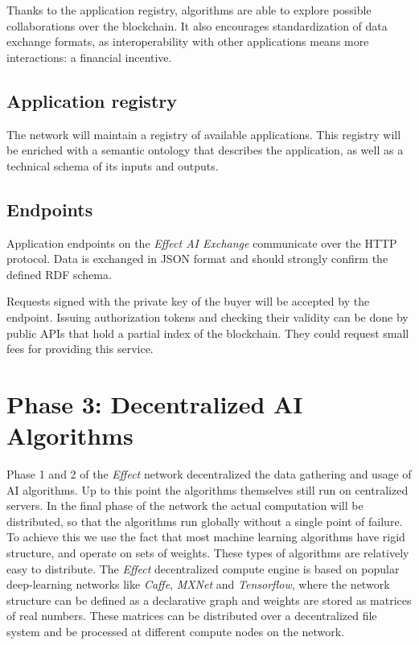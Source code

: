 \documentclass{article}
\begin{document}
Thanks to the application registry, algorithms are able to explore
possible collaborations over the blockchain. It also encourages
standardization of data exchange formats, as interoperability with
other applications means more interactions: a financial incentive.

\subsection{Application registry}
The network will maintain a registry of available applications. This
registry will be enriched with a semantic ontology that describes the
application, as well as a technical schema of its inputs and
outputs.

\subsection{Endpoints}
Application endpoints on the \emph{Effect AI Exchange} communicate
over the HTTP protocol. Data is exchanged in JSON format and should
strongly confirm the defined RDF schema.

Requests signed with the private key of the buyer will be accepted by
the endpoint. Issuing authorization tokens and checking their validity
can be done by public APIs that hold a partial index of the
blockchain. They could request small fees for providing this service.


\section{Phase 3: Decentralized AI Algorithms}
\label{sec:phase3}
Phase 1 and 2 of the \emph{Effect} network decentralized the data
gathering and usage of AI algorithms. Up to this point the algorithms
themselves still run on centralized servers. In the final phase of the
network the actual computation will be distributed, so that the
algorithms run globally without a single point of failure. To achieve
this we use the fact that most machine learning algorithms have rigid
structure, and operate on sets of weights. These types of algorithms
are relatively easy to distribute. The \emph{Effect} decentralized
compute engine is based on popular deep-learning networks like
\emph{Caffe}, \emph{MXNet} and \emph{Tensorflow}, where the network
structure can be defined as a declarative graph and weights are stored as
matrices of real numbers. These matrices can be distributed over a decentralized
file system and be processed at different compute nodes on the network.
\end{document}
